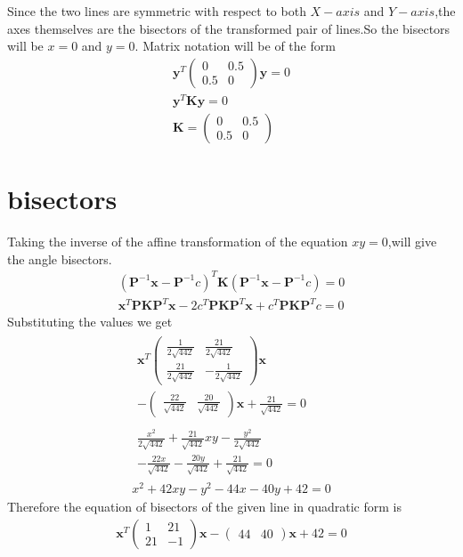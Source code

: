 \documentclass[journal,12pt,twocolumn]{IEEEtran}
\providecommand{\brak}[1]{\ensuremath{\left(#1\right)}}
\newcommand{\myvec}[1]{\ensuremath{\begin{pmatrix}#1\end{pmatrix}}}
\numberwithin{equation}{subsection}
\let\vec\mathbf
\begin{document}
Since the two lines are symmetric with respect to both $X-axis$ and $Y-axis$,the axes themselves are the bisectors of the transformed pair of lines.So the bisectors will be $x=0$ and $y=0$.
Matrix notation will be of the form
\begin{align}
    \vec{y}^T\myvec{0&0.5\\0.5&0}\vec{y}=0\\
    \vec{y}^T\vec{K}\vec{y}=0\\
    \vec{K}=\myvec{0&0.5\\0.5&0}
\end{align}
\section{bisectors}
Taking the inverse of the affine transformation of the equation $xy=0$,will give the angle bisectors.
\begin{align}
    \brak{\vec{P}^{-1}\vec{x}-\vec{P}^{-1}c}^T\vec{K}\brak{\vec{P}^{-1}\vec{x}-\vec{P}^{-1}c}=0\\
    \vec{x}^T\vec{P}\vec{K}\vec{P}^T\vec{x}-2c^T\vec{P}\vec{K}\vec{P}^T\vec{x}+c^T\vec{P}\vec{K}\vec{P}^Tc=0
\end{align}
Substituting the values we get
\begin{align}
    \begin{multlined}
        \vec{x}^T\myvec{\frac{1}{2\sqrt{442}}&\frac{21}{2\sqrt{442}}\\\frac{21}{2\sqrt{442}}&-\frac{1}{2\sqrt{442}}}\vec{x}\\
        -\myvec{\frac{22}{\sqrt{442}}&\frac{20}{\sqrt{442}}}\vec{x}+\frac{21}{\sqrt{442}}=0
    \end{multlined}\\
    \begin{multlined}
        \frac{x^2}{2\sqrt{442}}+\frac{21}{\sqrt{442}}xy-\frac{y^2}{2\sqrt{442}}\\
        -\frac{22x}{\sqrt{442}}-\frac{20y}{\sqrt{442}}+\frac{21}{\sqrt{442}}=0
    \end{multlined}\\
    x^2+42xy-y^2-44x-40y+42=0
\end{align}
Therefore the equation of bisectors of the given line in quadratic form is
\begin{align}
    \vec{x}^T\myvec{1&21\\21&-1}\vec{x}-\myvec{44&40}\vec{x}+42=0
\end{align}
\end{document}
